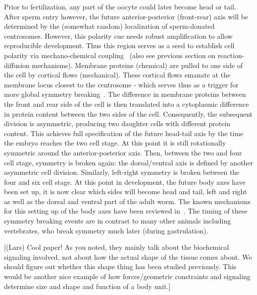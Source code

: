 Prior to fertilization, any part of the oocyte could later become head or tail. After sperm entry however, the future anterior-posterior (front-rear) axis will be determined by the (somewhat random) localization of sperm-donated centrosomes. However, this polarity cue needs robust amplification to allow reproducible development. Thus this region serves as a seed to establish cell polarity via mechano-chemical coupling~\cite{Goehring2013} (also see previous section on reaction-diffusion mechanisms). Membrane proteins (chemical) are pulled to one side of the cell by cortical flows (mechanical). These cortical flows emanate at the membrane locus closest to the centrosome - which serves thus as a trigger for more global symmetry breaking~\cite{Rose2014}. The difference in membrane proteins between the front and rear side of the cell is then translated into a cytoplasmic difference in protein content between the two sides of the cell. Consequently, the subsequent division is asymmetric, producing two daughter cells with different protein content. This achieves full specification of the future head-tail axis by the time the embryo reaches the two cell stage. At this point it is still rotationally symmetric around the anterior-posterior axis. Then, between the two and four cell stage, symmetry is broken again: the dorsal/ventral axis is defined by another asymmetric cell division. Similarly, left-right symmetry is broken between the four and six cell stage. At this point in development, the future body axes have been set up, it is now clear which sides will become head and tail, left and right as well as the dorsal and ventral part of the adult worm. The known mechanisms for this setting up of the body axes have been reviewed in~\cite{Rose2014}. The timing of these symmetry breaking events are in contrast to many other animals including vertebrates, who break symmetry much later (during gastrulation). 
%

[(Lars) Cool paper! As you noted, they mainly talk about the biochemical signaling involved, not about how the actual shape of the tissue comes about. We should figure out whether this shape thing has been studied previously. This would be another nice example of how forces/geometric constraints and signaling determine size and shape and function of a body unit.]

